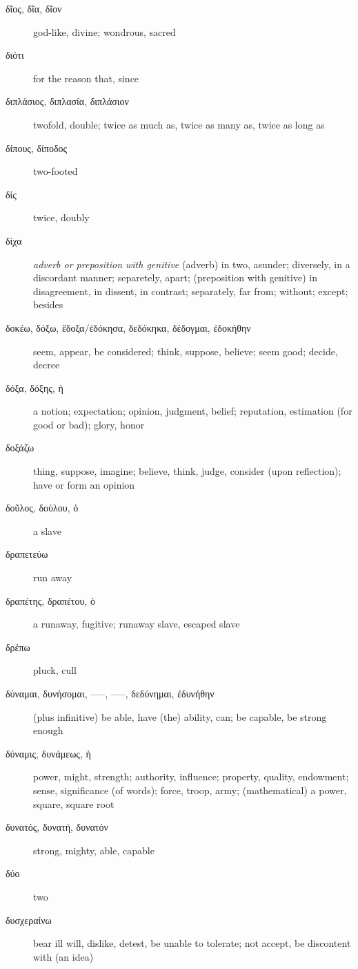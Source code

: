 \documentclass[12pt,letterpaper]{article}
\begin{document}
\begin{description}
    \item[\textgreek{δῖος, δῖα, δῖον}] god-like, divine; wondrous, sacred
    \item[\textgreek{διότι}] for the reason that, since
    \item[\textgreek{διπλάσιος, διπλασία, διπλάσιον}] twofold, double; twice as much as, twice as many as, twice as long as
    \item[\textgreek{δίπους, δίποδος}] two-footed
    \item[\textgreek{δίς}] twice, doubly
    \item[\textgreek{δίχα}] \textit{adverb or preposition with genitive} (adverb) in two, asunder; diversely, in a discordant manner; separetely, apart; (preposition with genitive) in disagreement, in dissent, in contrast; separately, far from; without; except; besides
    \item[\textgreek{δοκέω, δόξω, ἔδοξα/ἐδόκησα, δεδόκηκα, δέδογμαι, ἐδοκήθην}] \marginnote{*}seem, appear, be considered; think, suppose, believe; seem good; decide, decree
    \item[\textgreek{δόξα, δόξης, ἡ}] \marginnote{*}a notion; expectation; opinion, judgment, belief; reputation, estimation (for good or bad); glory, honor
    \item[\textgreek{δοξάζω}] thing, suppose, imagine; believe, think, judge, consider (upon reflection); have or form an opinion
    \item[\textgreek{δοῦλος, δούλου, ὁ}] \marginnote{*}a slave
    \item[\textgreek{δραπετεύω}] run away
    \item[\textgreek{δραπέτης, δραπέτου, ὁ}] a runaway, fugitive; runaway slave, escaped slave
    \item[\textgreek{δρέπω}] pluck, cull
    \item[\textgreek{δύναμαι, δυνήσομαι, –––, –––, δεδύνημαι, ἐδυνήθην}] \marginnote{*}(plus infinitive) be able, have (the) ability, can; be capable, be strong enough
    \item[\textgreek{δύναμις, δυνάμεως, ἡ}] \marginnote{*}power, might, strength; authority, influence; property, quality, endowment; sense, significance (of words); force, troop, army; (mathematical) a power, square, square root
    \item[\textgreek{δυνατός, δυνατή, δυνατόν}] \marginnote{*}strong, mighty, able, capable
    \item[\textgreek{δύο}] \marginnote{*}two
    \item[\textgreek{δυσχεραίνω}] bear ill will, dislike, detest, be unable to tolerate; not accept, be discontent with (an idea)

\end{description}
\end{document}
